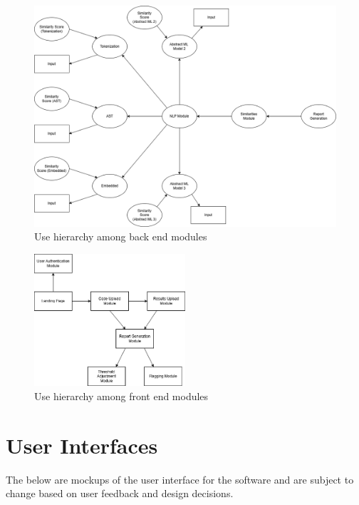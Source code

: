 \documentclass[12pt, titlepage]{article}
\begin{document}

\begin{figure}[H]
\centering
\includegraphics[width=\textwidth]{../Assets/BackEndHierarchy.png}
\caption{Use hierarchy among back end modules}
\label{FigUH}
\end{figure}



\begin{figure}[H]
  \centering
  \includegraphics[width=0.5\textwidth]{../Assets/FrontEndHierarchy.png}
  \caption{Use hierarchy among front end modules}
  \label{FigUH}
  \end{figure}

\newpage
\section{User Interfaces}
The below are mockups of the user interface for the software and are subject to change based on user feedback and design decisions.
\end{document}
